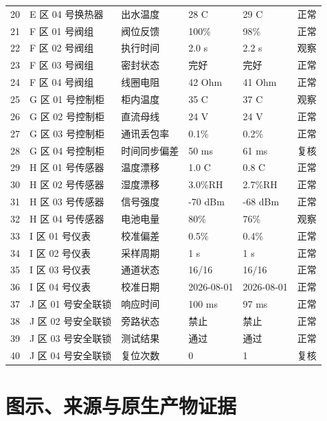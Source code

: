 \documentclass[UTF8,a4paper,11pt]{ctexart}
\begin{document}
\begin{longtable}{C{0.09\textwidth} p{0.23\textwidth} p{0.22\textwidth} p{0.15\textwidth} p{0.15\textwidth} p{0.10\textwidth}}
20 & E 区 04 号换热器 & 出水温度 & 28 C & 29 C & 正常 \\
21 & F 区 01 号阀组 & 阀位反馈 & 100\% & 98\% & 正常 \\
22 & F 区 02 号阀组 & 执行时间 & 2.0 s & 2.2 s & 观察 \\
23 & F 区 03 号阀组 & 密封状态 & 完好 & 完好 & 正常 \\
24 & F 区 04 号阀组 & 线圈电阻 & 42 Ohm & 41 Ohm & 正常 \\
25 & G 区 01 号控制柜 & 柜内温度 & 35 C & 37 C & 观察 \\
26 & G 区 02 号控制柜 & 直流母线 & 24 V & 24 V & 正常 \\
27 & G 区 03 号控制柜 & 通讯丢包率 & 0.1\% & 0.2\% & 正常 \\
28 & G 区 04 号控制柜 & 时间同步偏差 & 50 ms & 61 ms & 复核 \\
29 & H 区 01 号传感器 & 温度漂移 & 1.0 C & 0.8 C & 正常 \\
30 & H 区 02 号传感器 & 湿度漂移 & 3.0\%RH & 2.7\%RH & 正常 \\
31 & H 区 03 号传感器 & 信号强度 & -70 dBm & -68 dBm & 正常 \\
32 & H 区 04 号传感器 & 电池电量 & 80\% & 76\% & 观察 \\
33 & I 区 01 号仪表 & 校准偏差 & 0.5\% & 0.4\% & 正常 \\
34 & I 区 02 号仪表 & 采样周期 & 1 s & 1 s & 正常 \\
35 & I 区 03 号仪表 & 通道状态 & 16/16 & 16/16 & 正常 \\
36 & I 区 04 号仪表 & 校准日期 & 2026-08-01 & 2026-08-01 & 正常 \\
37 & J 区 01 号安全联锁 & 响应时间 & 100 ms & 97 ms & 正常 \\
38 & J 区 02 号安全联锁 & 旁路状态 & 禁止 & 禁止 & 正常 \\
39 & J 区 03 号安全联锁 & 测试结果 & 通过 & 通过 & 正常 \\
40 & J 区 04 号安全联锁 & 复位次数 & 0 & 1 & 复核 \\
\end{longtable}

\section{图示、来源与原生产物证据}
\end{document}

